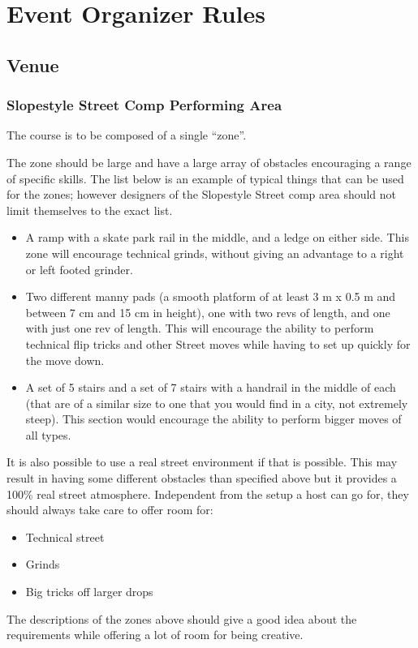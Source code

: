 \chapter{Event Organizer Rules}

\section{Venue}

\subsection{Slopestyle Street Comp Performing Area \label{sec:flat-street_street-performing-area}}
The course is to be composed of a single ``zone''.

The zone should be large and have a large array of obstacles encouraging a range of specific skills.
The list below is an example of  typical things that can be used for the zones; however designers of the Slopestyle Street comp area should not limit themselves to the exact list.

\begin{itemize}
\item A ramp with a skate park rail in the middle, and a ledge on either side.
This zone will encourage technical grinds, without giving an advantage to a right or left footed grinder.
\item Two different manny pads (a smooth platform of at least 3 m x 0.5 m and between 7 cm and 15 cm in height), one with two revs of length, and one with just one rev of length.
This will encourage the ability to perform technical flip tricks and other Street moves while having to set up quickly for the move down.
\item A set of 5 stairs and a set of 7 stairs with a handrail in the middle of each (that are of a similar size to one that you would find in a city, not extremely steep).
This section would encourage the ability to perform bigger moves of all types.
\end{itemize}

It is also possible to use a real street environment if that is possible.
This may result in having some different obstacles than specified above but it provides a 100\% real street atmosphere.
Independent from the setup a host can go for, they should always take care to offer room for:
\begin{itemize}
\item Technical street
\item Grinds
\item Big tricks off larger drops
\end{itemize}
The descriptions of the zones above should give a good idea about the requirements while offering a lot of room for being creative.

